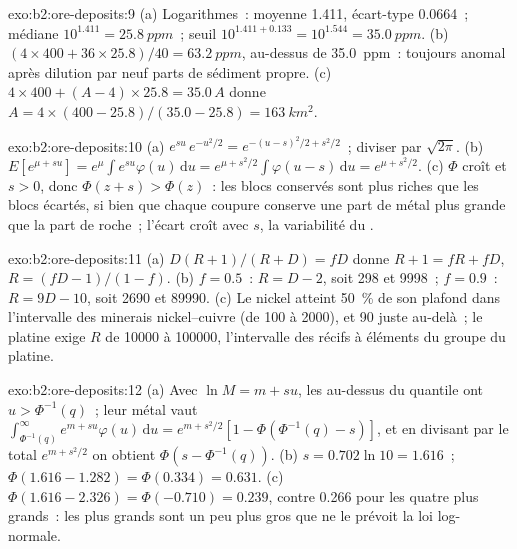 \begin{solution}{exo:b2:ore-deposits:9}
(a) Logarithmes~: moyenne 1.411, écart-type 0.0664~; médiane $10^{1.411} = \qty{25.8}{ppm}$~;
seuil $10^{1.411 + 0.133} = 10^{1.544} = \qty{35.0}{ppm}$. (b) $(4 \times 400 + 36 \times 25.8)/40 =
\qty{63.2}{ppm}$, au-dessus de \qty{35.0}{ppm}~: toujours anomal après dilution
par neuf parts de sédiment propre. (c) $4 \times 400 + (A - 4) \times 25.8 = 35.0\,A$ donne $A = 4 \times (400 -
25.8)/(35.0 - 25.8) = \qty{163}{km^2}$.
\end{solution}

\begin{solution}{exo:b2:ore-deposits:10}
(a) $e^{su}\,e^{-u^2/2} = e^{-(u - s)^2/2 + s^2/2}$~; diviser par $\sqrt{2\pi}$. (b) $E[e^{\mu + su}] =
e^{\mu}\int e^{su}\varphi(u)\,\mathrm{d}u = e^{\mu + s^2/2}\int\varphi(u - s)\,\mathrm{d}u = e^{\mu +
s^2/2}$. (c) $\Phi$ croît et $s > 0$, donc $\Phi(z + s) > \Phi(z)$~: les blocs conservés sont plus riches que les blocs
écartés, si bien que chaque coupure conserve une part de métal plus grande que la part de roche~; l'écart
croît avec $s$, la variabilité du .
\end{solution}

\begin{solution}{exo:b2:ore-deposits:11}
(a) $D(R + 1)/(R + D) = fD$ donne $R + 1 = fR + fD$, $R = (fD - 1)/(1 - f)$. (b) $f = 0.5$~: $R = D - 2$, soit
298 et \num{9998}~; $f = 0.9$~: $R = 9D - 10$, soit \num{2690} et \num{89990}. (c) Le nickel atteint \qty{50}{\percent}
de son plafond dans l'intervalle des minerais nickel--cuivre (de 100 à \num{2000}), et 90 juste au-delà~; le
platine exige $R$ de \num{10000} à \num{100000}, l'intervalle des récifs à éléments du groupe du platine.
\end{solution}

\begin{solution}{exo:b2:ore-deposits:12}
(a) Avec $\ln M = m + s u$, les  au-dessus du quantile ont $u > \Phi^{-1}(q)$~; leur métal vaut
$\int_{\Phi^{-1}(q)}^{\infty} e^{m + su}\varphi(u)\,\mathrm{d}u = e^{m + s^2/2}[1 - \Phi(\Phi^{-1}(q) -
s)]$, et en divisant par le total $e^{m + s^2/2}$ on obtient $\Phi(s - \Phi^{-1}(q))$. (b) $s = 0.702 \ln 10 =
1.616$~; $\Phi(1.616 - 1.282) = \Phi(0.334) = 0.631$. (c) $\Phi(1.616 - 2.326) = \Phi(-0.710) = 0.239$,
contre 0.266 pour les quatre plus grands~: les plus grands  sont un peu plus gros que ne le prévoit la
loi log-normale.
\end{solution}

